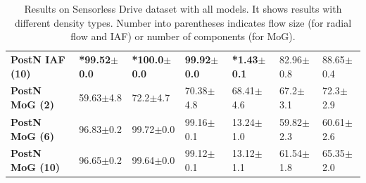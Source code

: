 \begin{table}[ht]
{\begin{tabular}{lllllll}
\textbf{PostN IAF (10) } &  \textbf{*99.52$\pm$0.0} &        \textbf{*100.0$\pm$0.0} &         \textbf{99.92$\pm$0.0}&   \textbf{*1.43$\pm$0.1} &      82.96$\pm$0.8 &       88.65$\pm$0.4 \\
\textbf{PostN MoG (2)  } &  59.63$\pm$4.8 &         72.2$\pm$4.7 &         70.38$\pm$4.8 &  68.41$\pm$4.6 &       67.2$\pm$3.1 &        72.3$\pm$2.9 \\
\textbf{PostN MoG (6)  } &  96.83$\pm$0.2 &        99.72$\pm$0.0 &         99.16$\pm$0.1 &  13.24$\pm$1.0 &      59.82$\pm$2.3 &       60.61$\pm$2.6 \\
\textbf{PostN MoG (10) } &  96.65$\pm$0.2 &        99.64$\pm$0.0 &         99.12$\pm$0.1 &  13.12$\pm$1.1 &      61.54$\pm$1.8 &       65.35$\pm$2.0 \\
\bottomrule
\end{tabular}

    }
    \caption{Results on Sensorless Drive dataset with all models. It shows results with different density types. Number into parentheses indicates flow size (for radial flow and IAF) or number of components (for MoG).}
    \label{fig:unc_sensorless_drive_full}
\end{table}

